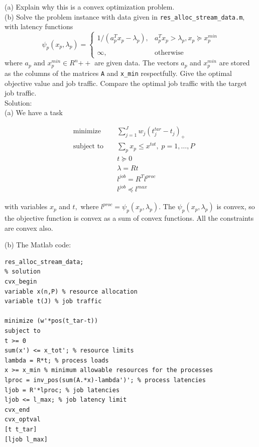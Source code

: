\documentclass{article}
\begin{document}
(a) Explain why this is a convex optimization problem.\\


(b) Solve the problem instance with data given in \verb|res_alloc_stream_data.m|, with latency functions 
$$
\psi_p(x_p, \lambda_p) = 
\begin{cases}
	1 / (a_p^T x_p - \lambda_p), & a_p^T x_p > \lambda_p,  
	x_p \succeq x_p^{min} \\
	\\
	\infty, & \text{otherwise}
\end{cases}
$$
where $a_p \text{ and }x_p^{min}\in R^n{++}$ are given data.
The vectors $a_p$ and $x_p^{min}$ are stored as the columns of the matrices \verb|A| and \verb|x_min| respectfully.
Give the optimal objective value and job traffic. Compare the optimal job traffic with the target job traffic.\\


Solution:\\

(a) We have a task

\begin{align*}
	&\text{minimize } && 
	\sum_{j = 1}^J w_j (t^{tar}_j - t_j)_+\\
	&\text{subject to } 
	&& \sum_p x_p \leq x^{tot}, \; p = 1, \dots, P\\
	& && t \succeq 0\\
	& && \lambda = Rt\\
	& && l^{job} = R^T l^{proc}\\
	& && l^{job} \preceq l^{max}
\end{align*} 

with variables $x_p$ and $t,$ where 
$l^{proc} = \psi_p(x_p, \lambda_p).$
The  $\psi_p(x_p, \lambda_p)$ is convex, so the objective function is convex as a sum of convex functions. All the constraints are convex also.

(b) The Matlab code:

\begin{verbatim}	
res_alloc_stream_data;
% solution
cvx_begin
variable x(n,P) % resource allocation
variable t(J) % job traffic

minimize (w'*pos(t_tar-t))
subject to 
t >= 0
sum(x') <= x_tot'; % resource limits
lambda = R*t; % process loads
x >= x_min % minimum allowable resources for the processes
lproc = inv_pos(sum(A.*x)-lambda')'; % process latencies
ljob = R'*lproc; % job latencies
ljob <= l_max; % job latency limit
cvx_end
cvx_optval
[t t_tar]
[ljob l_max]	
\end{verbatim}	
\end{document}

